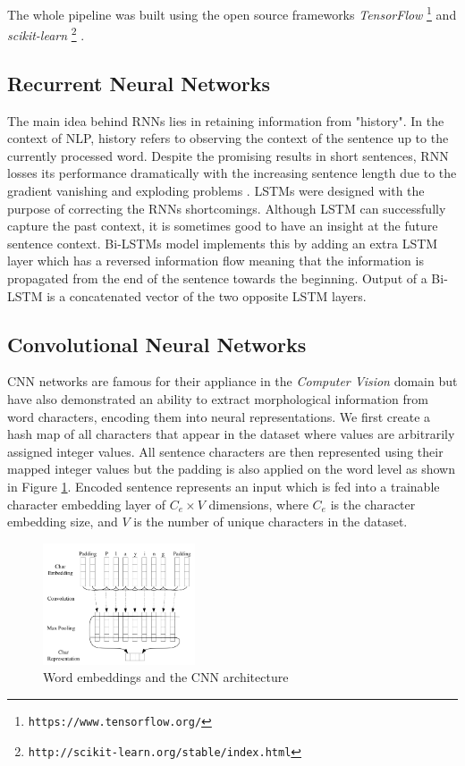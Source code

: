 \documentclass[10pt, a4paper]{article}
\begin{document}
The whole pipeline was built using the open source frameworks
\emph{TensorFlow} \footnote{\texttt{https://www.tensorflow.org/}} \citep{tensorflow2015}
and
\emph{scikit-learn} \footnote{\texttt{http://scikit-learn.org/stable/index.html}} \citep{scikit-learn}.

\subsection{Recurrent Neural Networks}

The main idea behind RNNs lies in retaining information from "history". In the 
context of NLP, history refers to observing the context of the sentence up to the
currently processed word. Despite the promising results in short sentences, RNN
losses its performance dramatically with the increasing sentence length due to 
the gradient vanishing \citep{bengio1994learning} and exploding problems 
\citep{pascanu2013difficulty}. LSTMs were designed with the purpose of correcting 
the RNNs shortcomings. Although LSTM can successfully capture the past context,
it is sometimes good to have an insight at the future sentence context. Bi-LSTMs 
model implements this by adding an extra LSTM layer which has a reversed information flow
meaning that the information is propagated from the end of the sentence towards
the beginning. Output of a Bi-LSTM is a concatenated vector of the two opposite LSTM layers.

\subsection{Convolutional Neural Networks}
CNN networks are famous for their appliance in the \emph{Computer Vision}
domain but have also demonstrated an ability to extract morphological information
from word characters, encoding them into neural representations. We first create
a hash map of all characters that appear in the dataset where values are arbitrarily
assigned integer values. All sentence characters are then represented using their
mapped integer values but the padding is also applied on the word level as shown
in Figure \ref{fig:cnn_embed}. Encoded sentence represents an input which is fed
into a trainable character embedding layer of $C_e \times V$ dimensions, where
$C_e$ is the character embedding size, and $V$ is the number of unique characters in the dataset.

\begin{figure}
  \caption{Word embeddings and the CNN architecture}
  \label{fig:cnn_embed}
  \centering
    \includegraphics[width=0.4\textwidth]{imgs/cnn_embed.png}
\end{figure}
\end{document}
